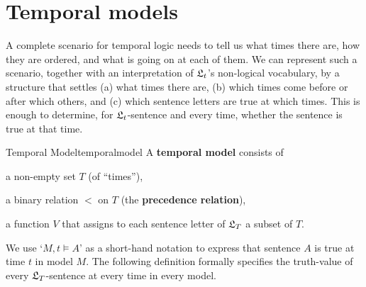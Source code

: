 \section{Temporal models}

A complete scenario for temporal logic needs to tell us what times there are,
how they are ordered, and what is going on at each of them. We can represent
such a scenario, together with an interpretation of $\mathfrak{L}_{t}$'s non-logical
vocabulary, by a structure that settles (a) what times there are, (b) which
times come before or after which others, and (c) which sentence letters are true
at which times. This is enough to determine, for $\mathfrak{L}_{t}$-sentence and every time, whether the sentence is true at that time.

\begin{definition}{Temporal Model}{temporalmodel}
  A \textbf{temporal model} consists of
  \vspace{-3mm}
  \begin{itemize*}
  \item a non-empty set $T$ (of ``times''),
  \item a binary relation $<$ on $T$ (the \textbf{precedence relation}),
  \item a function $V$ that assigns to each sentence letter of $\mathfrak{L}_T$
    a subset of $T$.
  \end{itemize*}
\end{definition}


We use `$M, t \models A$' as a short-hand notation to express that sentence $A$
is true at time $t$ in model $M$. The following definition formally specifies
the truth-value of every $\mathfrak{L}_T$-sentence at every time in every model.


